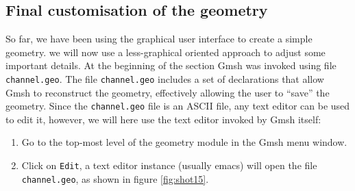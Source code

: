 \subsection{Final customisation of the geometry}
\label{ssect:2d_geo_fine_tuning}
\par
So far, we have been using the graphical user interface to create a simple geometry. we will now
use a less-graphical oriented approach to adjust some important details. At the beginning of the
section Gmsh was invoked using file \lstinline{channel.geo}. The file \lstinline{channel.geo}
 includes a set of declarations that allow Gmsh to reconstruct the geometry, effectively allowing the user
to ``save'' the geometry. Since the \lstinline{channel.geo} file is an ASCII file, any text editor can be
used to edit it, however, we will here use the text editor invoked by Gmsh itself:
\begin{enumerate}
  \item Go to the top-most level of the geometry module in the Gmsh menu window.
  \item Click on \lstinline{Edit}, a text editor instance (usually emacs) will open the file
        \lstinline{channel.geo}, as shown in figure \ref{fig:shot15}.
\end{enumerate}

